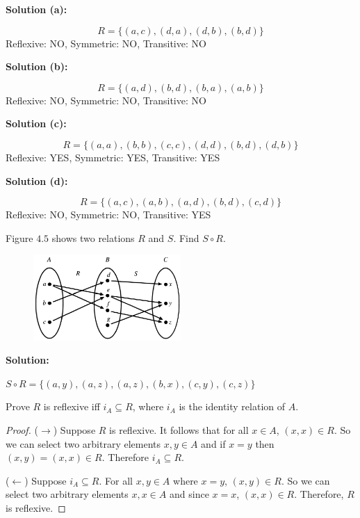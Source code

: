 \textbf{Solution (a):}

\[R = \{(a, c), (d, a), (d, b), (b, d)\}\]
Reflexive: NO, Symmetric: NO, Transitive: NO

\textbf{Solution (b):}

\[R = \{(a, d), (b, d), (b, a), (a, b)\}\]
Reflexive: NO, Symmetric: NO, Transitive: NO

\textbf{Solution (c):}

\[R = \{(a, a), (b, b), (c, c), (d, d), (b, d), (d, b)\}\]
Reflexive: YES, Symmetric: YES, Transitive: YES

\textbf{Solution (d):}

\[R = \{(a, c), (a, b), (a, d), (b, d), (c, d)\}\]
Reflexive: NO, Symmetric: NO, Transitive: YES

\begin{tcolorbox}[title=Problem 5, breakable]
    Figure $4.5$ shows two relations $R$ and $S$. Find $S \circ R$.
\end{tcolorbox}

\begin{figure}[h] 
\centering
\includegraphics[width=0.5\textwidth]{images/4.3_5.png} 
\end{figure}

\textbf{Solution:}

$S \circ R = \{(a, y), (a, z), (a, z), (b, x), (c, y), (c, z)\}$

\begin{tcolorbox}[title=Problem 7, breakable]
    Prove $R$ is reflexive iff $i_A \subseteq R$,
    where $i_A$ is the identity relation of $A$.
\end{tcolorbox}

\begin{proof}
    ($\rightarrow$) Suppose $R$ is reflexive.
    It follows that for all $x \in A$, $(x, x) \in R$.
    So we can select two arbitrary elements $x, y \in A$
        and if $x = y$ then $(x, y) = (x, x) \in R$.
    Therefore $i_A \subseteq R$.

    ($\leftarrow$) Suppose $i_A \subseteq R$.
    For all $x, y \in A$ where $x = y$, $(x, y) \in R$.
    So we can select two arbitrary elements $x, x \in A$
        and since $x = x$, $(x, x) \in R$.
    Therefore, $R$ is reflexive.
\end{proof}

